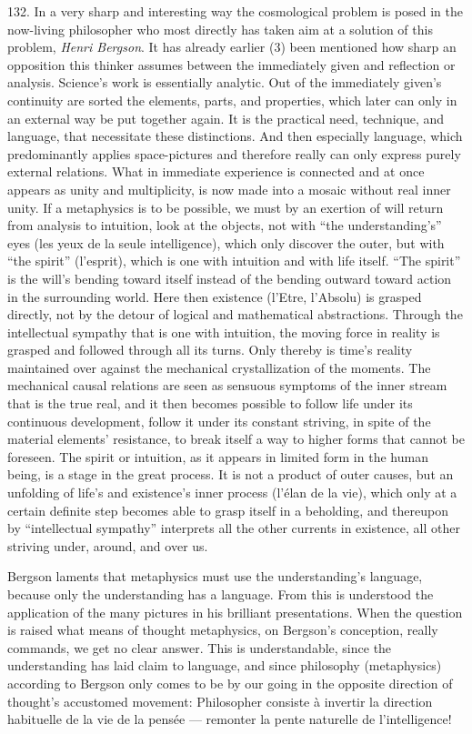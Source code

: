 \documentclass[12pt,a4paper]{book}
\newcommand{\opage}[1]{\marginnote{\footnotesize\textit{[#1]}}}
\begin{document}
132. In a very sharp and interesting way the cosmological problem is posed in the now-living
philosopher who most directly has taken aim at a solution of this problem, \emph{Henri Bergson}. It
has already earlier (3) been mentioned how sharp an opposition this thinker assumes between the
immediately given and reflection or analysis. Science's work is essentially analytic. Out of the
immediately given's continuity are sorted the elements, parts, and properties, which later can only
in an external way be put together again. It is the practical need, technique, and language, that
necessitate these distinctions. And then especially language, which predominantly applies
space-pictures and therefore really can only express purely external relations. What in immediate
experience is connected and at once appears as unity and multiplicity, is now made into a mosaic
without \opage{316}real inner unity. If a metaphysics is to be possible, we must by an exertion of will return
from analysis to intuition, look at the objects, not with ``the understanding's'' eyes (les yeux de
la seule intelligence), which only discover the outer, but with ``the spirit'' (l'esprit), which is
one with intuition and with life itself. ``The spirit'' is the will's bending toward itself instead
of the bending outward toward action in the surrounding world. Here then existence (l'Etre,
l'Absolu) is grasped directly, not by the detour of logical and mathematical abstractions. Through
the intellectual sympathy that is one with intuition, the moving force in reality is grasped and
followed through all its turns. Only thereby is time's reality maintained over against the mechanical
crystallization of the moments. The mechanical causal relations are seen as sensuous symptoms of the
inner stream that is the true real, and it then becomes possible to follow life under its continuous
development, follow it under its constant striving, in spite of the material elements' resistance, to
break itself a way to higher forms that cannot be foreseen. The spirit or intuition, as it appears in
limited form in the human being, is a stage in the great process. It is not a product of outer causes,
but an unfolding of life's and existence's inner process (l'élan de la vie), which only at a certain
definite step becomes able to grasp itself in a beholding, and thereupon by ``intellectual sympathy''
interprets all the other currents in existence, all other striving under, around, and over us.

Bergson laments that metaphysics must use the understanding's language, because only the understanding
has a language. From this is understood the application of the many pictures in his brilliant
presentations. When the question is raised what means of thought metaphysics, on Bergson's conception,
really commands, we get no clear answer. This is understandable, since the understanding has laid claim
to language, and since philosophy (metaphysics) according to Bergson only comes to be by our going in
the opposite direction of thought's accustomed movement: Philosopher \opage{317}consiste à invertir la direction
habituelle de la vie de la pensée --- remonter la pente naturelle de l'intelligence!
\end{document}
